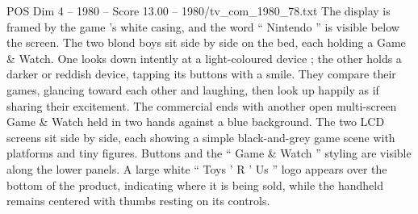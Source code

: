 \begin{textsample}{POS Dim 4 – 1980 – Score 13.00 – 1980/tv\_com\_1980\_78.txt}
The display is framed by the game ’s white casing, and the word “ Nintendo ” is visible below the screen.
The two blond boys sit side by side on the bed, each holding a Game \& Watch.
One looks down intently at a light-coloured device ; the other holds a darker or reddish device, tapping its buttons with a smile.
They compare their games, glancing toward each other and laughing, then look up happily as if sharing their excitement.
The commercial ends with another open multi-screen Game \& Watch held in two hands against a blue background.
The two LCD screens sit side by side, each showing a simple black-and-grey game scene with platforms and tiny figures.
Buttons and the “ Game \& Watch ” styling are visible along the lower panels.
A large white “ Toys ’ R ’ Us ” logo appears over the bottom of the product, indicating where it is being sold, while the handheld remains centered with thumbs resting on its controls.

\end{textsample}
